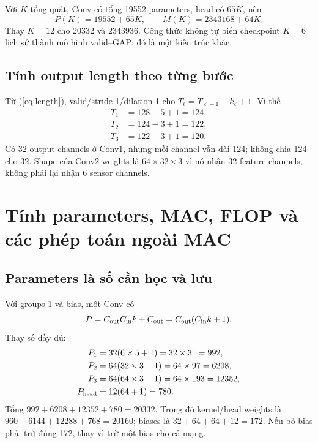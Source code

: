 \documentclass[11pt,a4paper]{article}
\theoremstyle{definition}
\begin{document}
Với $K$ tổng quát, Conv có tổng 19552 parameters, head có $65K$, nên
\begin{equation}
P(K)=19552+65K,\qquad M(K)=2343168+64K.
\end{equation}
Thay $K=12$ cho 20332 và 2343936. Công thức không tự biến checkpoint
$K=6$ lịch sử thành mô hình valid--GAP; đó là một kiến trúc khác.

\subsection{Tính output length theo từng bước}
Từ (\ref{eq:length}), valid/stride 1/dilation 1 cho
$T_{\ell}=T_{\ell-1}-k_\ell+1$. Vì thế
\begin{align}
T_1&=128-5+1=124,\\
T_2&=124-3+1=122,\\
T_3&=122-3+1=120.
\end{align}
Có 32 output channels ở Conv1, nhưng mỗi channel vẫn dài 124; không chia
124 cho 32. Shape của Conv2 weights là $64\times32\times3$ vì nó nhận
32 feature channels, không phải lại nhận 6 sensor channels.

\section{Tính parameters, MAC, FLOP và các phép toán ngoài MAC}
\subsection{Parameters là số cần học và lưu}
Với groups 1 và bias, một Conv có
\begin{equation}
P=C_{\rm out}C_{\rm in}k+C_{\rm out}
=C_{\rm out}(C_{\rm in}k+1).
\end{equation}
Thay số đầy đủ:
\begin{align}
P_1&=32(6\times5+1)=32\times31=992,\\
P_2&=64(32\times3+1)=64\times97=6208,\\
P_3&=64(64\times3+1)=64\times193=12352,\\
P_{\rm head}&=12(64+1)=780.
\end{align}
Tổng $992+6208+12352+780=20332$. Trong đó kernel/head weights là
$960+6144+12288+768=20160$; biases là $32+64+64+12=172$.
Nếu bỏ bias phải trừ đúng 172, thay vì trừ một bias cho cả mạng.
\end{document}
